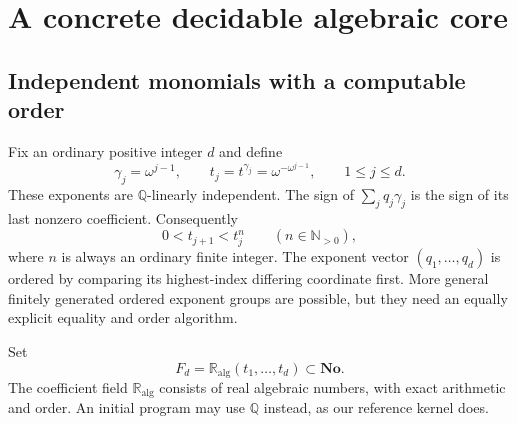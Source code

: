 \documentclass[11pt,letterpaper]{article}
\theoremstyle{definition}
\newcommand{\No}{\mathbf{No}}
\newcommand{\Q}{\mathbb Q}
\newcommand{\N}{\mathbb N}
\newcommand{\RA}{\mathbb R_{\mathrm{alg}}}
\numberwithin{equation}{section}
\begin{document}
\section{A concrete decidable algebraic core}\label{sec:core}
\subsection{Independent monomials with a computable order}
Fix an ordinary positive integer $d$ and define
\begin{equation}\label{eq:generators}
 \gamma_j=\omega^{j-1},\qquad t_j=t^{\gamma_j}
       =\omega^{-\omega^{j-1}},\qquad 1\le j\le d.
\end{equation}
These exponents are $\Q$-linearly independent. The sign of $\sum_jq_j\gamma_j$ is the sign of its last nonzero coefficient. Consequently
\[
 0<t_{j+1}<t_j^n\qquad(n\in\N_{>0}),
\]
where $n$ is always an ordinary finite integer. The exponent vector $(q_1,\ldots,q_d)$ is ordered by comparing its highest-index differing coordinate first. More general finitely generated ordered exponent groups are possible, but they need an equally explicit equality and order algorithm.

Set
\begin{equation}\label{eq:Fd}
 F_d=\RA(t_1,\ldots,t_d)\subset\No.
\end{equation}
The coefficient field $\RA$ consists of real algebraic numbers, with exact arithmetic and order. An initial program may use $\Q$ instead, as our reference kernel does.
\end{document}

